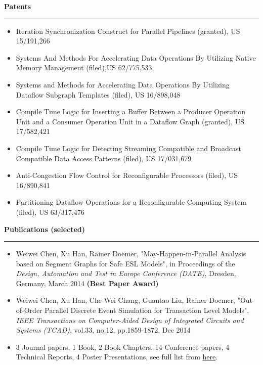 \documentclass[10pt,A4]{article}
\newcommand{\cvsection}[1]
{
	\begin{flushleft}
  \LARGE\textcolor{sectcol}{\textbf{  #1}}
	\end{flushleft}
  \vspace{-15pt}
  \textcolor{softcol}{\hrule}
  \vspace{8pt}
}
\begin{document}
\cvsection{Patents}
\vspace{-4pt}
\begin{itemize}
 \setlength\itemsep{-0.1cm}
 \item Iteration Synchronization Construct for Parallel Pipelines (granted), \textcolor{bgcol}{US 15/191,266}
 \item Systems And Methods For Accelerating Data Operations By Utilizing Native Memory Management (filed),\textcolor{bgcol}{US 62/775,533}
 \item Systems and Methods for Accelerating Data Operations By Utilizing Dataflow Subgraph Templates (filed), \textcolor{bgcol}{US 16/898,048}
 \item Compile Time Logic for Inserting a Buffer Between a Producer Operation Unit and a Consumer Operation Unit in a Dataflow Graph (granted), \textcolor{bgcol}{US 17/582,421}
 \item Compile Time Logic for Detecting Streaming Compatible and Broadcast Compatible Data Access Patterns (filed), \textcolor{bgcol}{US 17/031,679}
 \item Anti-Congestion Flow Control for Reconfigurable Processors (filed), \textcolor{bgcol}{US 16/890,841}
 \item Partitioning Dataflow Operations for a Reconfigurable Computing System (filed), \textcolor{bgcol}{US 63/317,476}
\end{itemize}

\cvsection{Publications (selected)}
\vspace{-4pt}
\begin{itemize}
 \setlength\itemsep{-0.1cm}
\item Weiwei Chen, Xu Han, Rainer Doemer, \textcolor{bgcol}{"May-Happen-in-Parallel Analysis based on Segment Graphs for Safe ESL Models"},
  in Proceedings of the \emph{Design, Automation and Test in Europe Conference (DATE)}, Dresden, Germany, March 2014 \textbf{(Best Paper Award)}
 \item Weiwei Chen, Xu Han, Che-Wei Chang, Guantao Liu, Rainer Doemer, \textcolor{bgcol}{"Out-of-Order Parallel Discrete Event Simulation for Transaction Level Models"},
  \emph{IEEE Transactions on Computer-Aided Design of Integrated Circuits and Systems (TCAD)}, vol.33, no.12, pp.1859-1872, Dec 2014
 \item 3 Journal papers, 1 Book, 2 Book Chapters, 14 Conference papers, 4 Technical Reports, 4 Poster Presentations,
  see full list from \href{http://www.cecs.uci.edu/~weiweic/pubs\_by\_type.html}{here}.
\end{itemize}
\end{document}
